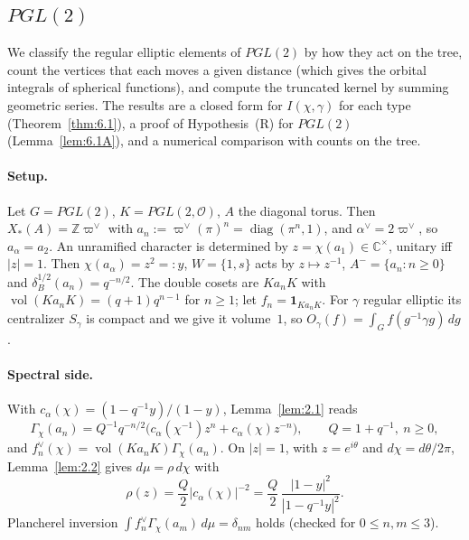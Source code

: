 \documentclass[12pt,letterpaper]{article}
\numberwithin{equation}{section}
\theoremstyle{plain}
\theoremstyle{remark}
\theoremstyle{plain}
\theoremstyle{definition}
\theoremstyle{remark}
\theoremstyle{remark}
\newcommand{\OO}{\mathcal{O}}
\DeclareMathOperator{\vol}{vol}
\DeclareMathOperator{\diag}{diag}
\newcommand{\one}{\mathbf 1}
\begin{document}
\subsection{\texorpdfstring{$PGL(2)$}{PGL(2)}}\label{sec:6.1}

We classify the regular elliptic elements of $PGL(2)$ by how they act on the tree, count the vertices that each moves a given distance (which gives the orbital integrals of spherical functions), and compute the truncated kernel by summing geometric series. The results are a closed form for $I(\chi,\gamma)$ for each type (Theorem~\ref{thm:6.1}), a proof of Hypothesis~(R) for $PGL(2)$ (Lemma~\ref{lem:6.1A}), and a numerical comparison with counts on the tree.


\paragraph{Setup.} Let $G=PGL(2)$, $K=PGL(2,\OO)$, $A$ the diagonal torus. Then $X_*(A)=\mathbb{Z}\varpi^\vee$ with $a_n:=\varpi^\vee(\pi)^n=\diag(\pi^n,1)$, and $\alpha^\vee=2\varpi^\vee$, so $a_\alpha=a_2$. An unramified character is determined by $z=\chi(a_1)\in\mathbb{C}^\times$, unitary iff $|z|=1$. Then $\chi(a_\alpha)=z^2=:y$, $W=\{1,s\}$ acts by $z\mapsto z^{-1}$, $A^-=\{a_n:n\ge0\}$ and $\delta_B^{1/2}(a_n)=q^{-n/2}$. The double cosets are $Ka_nK$ with $\vol(Ka_nK)=(q+1)q^{n-1}$ for $n\ge1$; let $f_n=\one_{Ka_nK}$. For $\gamma$ regular elliptic its centralizer $S_\gamma$ is compact and we give it volume~$1$, so $O_\gamma(f)=\int_{G}f(g^{-1}\gamma g)\,dg$.

\paragraph{Spectral side.} With $c_\alpha(\chi)=(1-q^{-1}y)/(1-y)$, Lemma~\ref{lem:2.1} reads
\begin{equation}\label{eq:6.1}
\Gamma_\chi(a_n)=Q^{-1}q^{-n/2}\big(c_\alpha(\chi^{-1})z^{n}+c_\alpha(\chi)z^{-n}\big),\qquad Q=1+q^{-1},\ n\ge0,
\end{equation}
and $f_n^\vee(\chi)=\vol(Ka_nK)\Gamma_\chi(a_n)$. On $|z|=1$, with $z=e^{i\theta}$ and $d\chi=d\theta/2\pi$, Lemma~\ref{lem:2.2} gives $d\mu=\rho\,d\chi$ with
\begin{equation}\label{eq:6.2}
\rho(z)=\frac{Q}{2}|c_\alpha(\chi)|^{-2}=\frac Q2\,\frac{|1-y|^2}{|1-q^{-1}y|^2}.
\end{equation}
Plancherel inversion $\int f_n^\vee\Gamma_\chi(a_m)\,d\mu=\delta_{nm}$ holds (checked for $0\le n,m\le3$).
\end{document}
